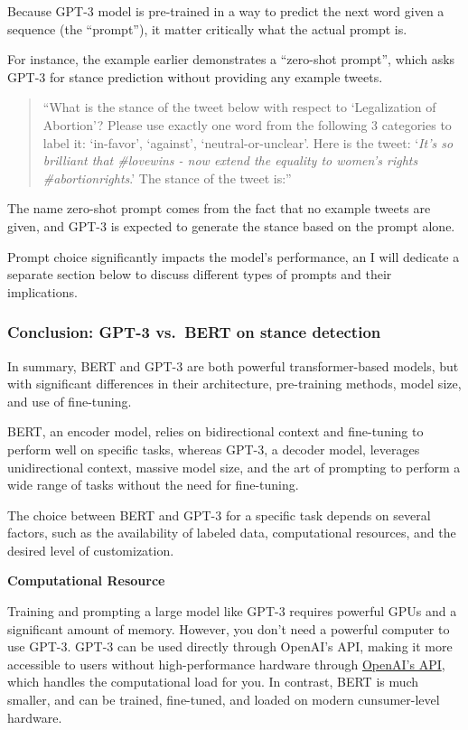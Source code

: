 \documentclass[11pt]{article}
\begin{document}
Because GPT-3 model is pre-trained in a way to predict the next word
given a sequence (the ``prompt''), it matter critically what the actual
prompt is.

For instance, the example earlier demonstrates a ``zero-shot prompt'',
which asks GPT-3 for stance prediction without providing any example
tweets.

\begin{quote}
``What is the stance of the tweet below with respect to `Legalization of
Abortion'? Please use exactly one word from the following 3 categories
to label it: `in-favor', `against', `neutral-or-unclear'. Here is the
tweet: `\emph{It's so brilliant that \#lovewins - now extend the
equality to women's rights \#abortionrights}.' The stance of the tweet
is:''
\end{quote}

The name zero-shot prompt comes from the fact that no example tweets are
given, and GPT-3 is expected to generate the stance based on the prompt
alone.

Prompt choice significantly impacts the model's performance, an I will
dedicate a separate section below to discuss different types of prompts
and their implications.

    \hypertarget{conclusion-gpt-3-vs.-bert-on-stance-detection}{%
\subsubsection{Conclusion: GPT-3 vs.~BERT on stance
detection}\label{conclusion-gpt-3-vs.-bert-on-stance-detection}}

In summary, BERT and GPT-3 are both powerful transformer-based models,
but with significant differences in their architecture, pre-training
methods, model size, and use of fine-tuning.

BERT, an encoder model, relies on bidirectional context and fine-tuning
to perform well on specific tasks, whereas GPT-3, a decoder model,
leverages unidirectional context, massive model size, and the art of
prompting to perform a wide range of tasks without the need for
fine-tuning.

The choice between BERT and GPT-3 for a specific task depends on several
factors, such as the availability of labeled data, computational
resources, and the desired level of customization.

\textbf{Computational Resource}

Training and prompting a large model like GPT-3 requires powerful GPUs
and a significant amount of memory. However, you don't need a powerful
computer to use GPT-3. GPT-3 can be used directly through OpenAI's API,
making it more accessible to users without high-performance hardware
through
\href{https://platform.openai.com/docs/api-reference/completions/create}{OpenAI's
API}, which handles the computational load for you. In contrast, BERT is
much smaller, and can be trained, fine-tuned, and loaded on modern
cunsumer-level hardware.
\end{document}
